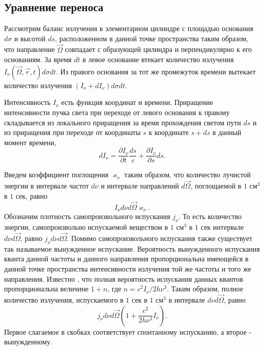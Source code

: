 \subsection{Уравнение переноса}
Рассмотрим баланс излучения в элементарном цилиндре с площадью основания $d\sigma$ и высотой $ds$, расположенном в данной точке пространства таким образом, что направление $\vec\Omega$ совпадает с образующей цилиндра и перпендикулярно к его основаниям. За время $dt$ в левое основание втекает количество излучения $I_{\nu} (\vec\Omega, \vec r,t)d\sigma dt$. Из правого основания за тот же промежуток времени вытекает количество излучения $(I_{\nu} + dI_{\nu})d \sigma dt$.

Интенсивность $I_{\nu}$ есть функция координат и времени. Приращение интенсивности пучка света при переходе от левого основания к правому складывается из локального приращения за время прохождения светом пути $ds$ и из приращения при переходе от координаты $s$ к координате $s+ds$ в данный момент времени, 
\begin {equation}
dI_{\nu}  = \frac{\partial I_{\nu}}{\partial t } \frac{ds}{c}+\frac{\partial I_{\nu}}{\partial s}ds.
\end {equation}

Введем коэффициент поглощения $\varkappa_\nu$ таким образом, что количество лучистой энергии в интервале частот $d\nu$ и интервале направлений $d\vec\Omega$, поглощаемой в $1 \text{ см}^3$ в  $1 \text{ сек}$, равно
\begin {equation}
I_{\nu}d\nu d\vec\Omega \varkappa_{\nu}.
\label {3}
\end {equation}
Обозначим плотность самопроизвольного испускания $j_\nu$. То есть количество энергии, самопроизвольно испускаемой веществом  в $1 \text{ см}^3$ в  $1 \text{ сек}$ интервале $d\nu d\vec\Omega$, равно $j_{\nu}d\nu d\vec\Omega$. Помимо самопроизвольного испускания также существует так называемое вынужденное испускание. Вероятность вынужденного испускания кванта данной частоты и данного направления пропорциональна имеющейся в данной точке пространства интенсивности излучения той же частоты и того же направления. Известно \cite{}, что полная вероятность испускания данных квантов пропорциональна величине $1+n$, где $n = c^2I_{\nu}/2h\nu^3$. Таким образом, полное количество излучения, испускаемого в $1 \text{ сек}$ в $1 \text{ см}^3$ в интервале $d\nu d\vec\Omega$, равно 
\begin {equation}
j_{\nu} d\nu d\vec\Omega(1+\frac{c^2}{2h\nu^3}I_{\nu}).
\label{4}
\end {equation}
Первое слагаемое в скобках соответствует спонтанному испусканию, а второе - вынужденному. 


